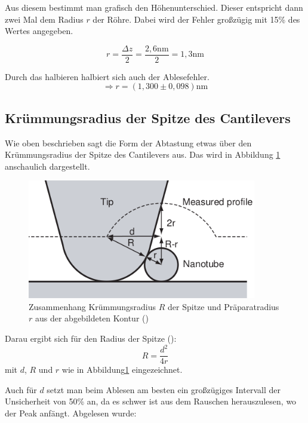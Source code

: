 Aus diesem bestimmt man grafisch den Höhenunterschied. Dieser entspricht dann zwei Mal dem Radius $r$ der Röhre. Dabei wird der Fehler 
großzügig mit 15\% des Wertes angegeben.

\begin{equation*}
   r = \frac{\Delta z}{2} = \frac{2,6\mathrm{nm}}{2} = 1,3\mathrm{nm}
\end{equation*}

Durch das halbieren halbiert sich auch der Ablesefehler. 
\begin{equation*}
    \Rightarrow r = (1,300 \pm 0,098)\mathrm{nm}
\end{equation*}


\subsection{Krümmungsradius der Spitze des Cantilevers}

Wie oben beschrieben sagt die Form der Abtastung etwas über den Krümmungsradius der Spitze des Cantilevers aus. Das wird in Abbildung 
\ref{NanoTip} anschaulich dargestellt.

\begin{figure}
    \centering
    \includegraphics[width = 10cm]{Bilder/Nanotubes/TipGeoNano.png}
    \caption{Zusammenhang Krümmungsradius $R$ der Spitze und Präparatradius $r$ aus der abgebildeten Kontur (\cite[S.46]{SampleKit2007})}
    \label{NanoTip}
\end{figure}

Darau ergibt sich für den Radius der Spitze (\cite[S.47]{SampleKit2007}):\\
\begin{equation}
    R = \frac{d^2}{4r}
\end{equation}
mit $d$, $R$ und $r$ wie in Abbildung\ref{NanoTip} eingezeichnet.

Auch für $d$ setzt man beim Ablesen am besten ein großzügiges Intervall der Unsicherheit von 50\% an, da es schwer ist aus 
dem Rauschen herauszulesen, wo der Peak anfängt. Abgelesen wurde:\\

